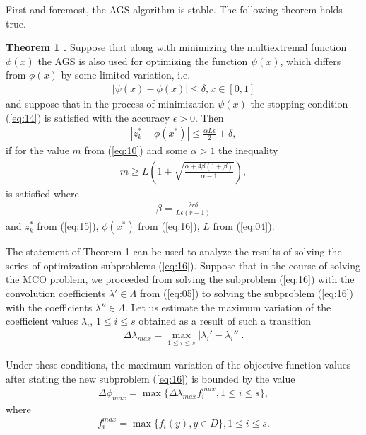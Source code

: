 \documentclass[smallcondensed]{svjour3}     %
\begin{document}
First and foremost, the AGS algorithm is stable. The following theorem holds true. \par

{\bf Theorem 1 \cite{c37,c38}.} Suppose that along with minimizing the multiextremal function $\phi(x)$ the AGS is also used for optimizing the function $\psi(x)$, which  differs from $\phi(x)$ by some limited variation, i.e.
\begin{eqnarray} \label{eq:17}
|\psi(x) - \phi(x)| \leq \delta, x \in[0,1] 
\end{eqnarray}
and suppose that in the process of minimization $\psi(x)$ the stopping condition (\ref{eq:14}) is satisfied with the accuracy $\epsilon > 0$. Then
\begin{eqnarray} \label{eq:18}
|z_k^*-\phi(x^*)| \leq \frac{\alpha L \epsilon}{2} + \delta, 
\end{eqnarray}
if  for the value $m$ from (\ref{eq:10}) and some $ \alpha> 1$ the inequality
\begin{eqnarray} \label{eq:19}
m \geq L\left( 1+\sqrt{ \frac{\alpha + 4 \beta(1 + \beta)}{\alpha - 1}} \right),
\end{eqnarray}
is satisfied where
\begin{eqnarray} \label{eq:20}
\beta = \frac{2 r \delta}{L\epsilon(r-1)}
\end{eqnarray}
and $z_k^*$ from (\ref{eq:15}), $\phi(x^*)$ from (\ref{eq:16}), $L$ from (\ref{eq:04}). \par

The statement of Theorem 1 can be used to analyze the results of solving the series of optimization subproblems (\ref{eq:16}). Suppose that in the course of solving the MCO problem, we proceeded from solving the subproblem (\ref{eq:16}) with the convolution coefficients $\lambda' \in \Lambda$ from (\ref{eq:05}) to solving the subproblem (\ref{eq:16}) with the coefficients $\lambda'' \in \Lambda$. Let us estimate the maximum variation of the coefficient values  $\lambda_i$, $1 \leq i \leq s$ obtained as a result of such a transition
\begin{eqnarray} \label{eq:21}
\Delta \lambda_{max}=\max_{1 \leq i \leq s}{|\lambda_i'-\lambda_i''|}.
\end{eqnarray}

Under these conditions, the maximum variation of the objective function values after stating the new subproblem (\ref{eq:16}) is bounded by the value
\begin{eqnarray} \label{eq:22}
\Delta \phi_{max}=\max{\{\Delta \lambda_{max} f_i^{max}, 1 \leq i \leq s \},}
\end{eqnarray}
where
\begin{eqnarray*} 
f_i^{max} = \max { \{ f_i (y), y \in D \}, 1 \leq i \leq s  }.
\end{eqnarray*}
\end{document}
